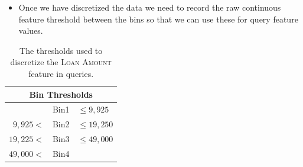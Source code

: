 \documentclass[xcolor={table}]{beamer}
\newcommand{\featN}[1]{\textsc{#1}}
\begin{document}
\begin{frame} 
\begin{itemize}
\item Once we have discretized the data we need to record the raw continuous feature threshold between the bins so that we can use these for query feature values. 
\end{itemize}
\begin{table}[!tb]
\caption{The thresholds used to discretize the \featN{Loan Amount} feature in queries.}
\label{table:binthresholds}
\centering
\begin{footnotesize}
\begin{tabular}{ rcl }
\hline
\multicolumn{3}{c}{\textbf{Bin Thresholds}}\\
\hline
~ &  Bin1 & $\leq 9,925$\\
$9,925<$ &  Bin2 & $\leq 19,250$\\
$19,225<$ &  Bin3 & $\leq 49,000$\\
$49,000<$ &  Bin4 & ~\\
\hline
\end{tabular}
\end{footnotesize}
\end{table}
\end{frame} 
\end{document}
